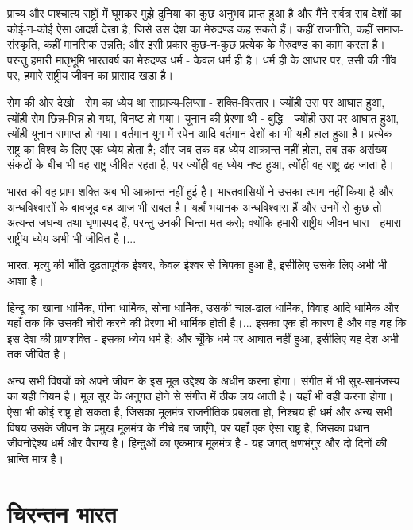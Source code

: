 प्राच्य और पाश्चात्य राष्ट्रों में घूमकर मुझे दुनिया का कुछ अनुभव प्राप्त हुआ है और मैंने सर्वत्र सब देशों का कोई-न-कोई ऐसा आदर्श देखा है, जिसे उस देश का मेरुदण्ड कह सकते हैं। कहीं राजनीति, कहीं समाज-संस्कृति, कहीं मानसिक उन्नति; और इसी प्रकार कुछ-न-कुछ प्रत्येक के मेरुदण्ड का काम करता है। परन्तु हमारी मातृभूमि भारतवर्ष का मेरुदण्ड धर्म - केवल धर्म ही है। धर्म ही के आधार पर, उसी की नींव पर, हमारे राष्ट्रीय जीवन का प्रासाद खड़ा है। 

रोम की ओर देखो। रोम का ध्येय था साम्राज्य-लिप्सा - शक्ति-विस्तार। ज्योंही उस पर आघात हुआ, त्योंही रोम छिन्न-भिन्न हो गया, विनष्ट हो गया। यूनान की प्रेरणा थी - बुद्धि। ज्योंही उस पर आघात हुआ, त्योंही यूनान समाप्त हो गया। वर्तमान युग में स्पेन आदि वर्तमान देशों का भी यही हाल हुआ है। प्रत्येक राष्ट्र का विश्व के लिए एक ध्येय होता है; और जब तक वह ध्येय आक्रान्त नहीं होता, तब तक असंख्य संकटों के बीच भी वह राष्ट्र जीवित रहता है, पर ज्योंही वह ध्येय नष्ट हुआ, त्योंही वह राष्ट्र ढह जाता है। 

भारत की वह प्राण-शक्ति अब भी आक्रान्त नहीं हुई है। भारतवासियों ने उसका त्याग नहीं किया है और अन्धविश्वासों के बावजूद वह आज भी सबल है। यहाँ भयानक अन्धविश्वास हैं और उनमें से कुछ तो अत्यन्त जघन्य तथा घृणास्पद हैं, परन्तु उनकी चिन्ता मत करो; क्योंकि हमारी राष्ट्रीय जीवन-धारा - हमारा राष्ट्रीय ध्येय अभी भी जीवित है।... 

भारत, मृत्यु की भाँति दृढ़तापूर्वक ईश्वर, केवल ईश्वर से चिपका हुआ है, इसीलिए उसके लिए अभी भी आशा है। 

हिन्दू का खाना धार्मिक, पीना धार्मिक, सोना धार्मिक, उसकी चाल-ढाल धार्मिक, विवाह आदि धार्मिक और यहाँ तक कि उसकी चोरी करने की प्रेरणा भी धार्मिक होती है।... इसका एक ही कारण है और वह यह कि इस देश की प्राणशक्ति - इसका ध्येय धर्म है; और चूँकि धर्म पर आघात नहीं हुआ, इसीलिए यह देश अभी तक जीवित है। 

अन्य सभी विषयों को अपने जीवन के इस मूल उद्देश्य के अधीन करना होगा। संगीत में भी सुर-सामंजस्य का यही नियम है। मूल सुर के अनुगत होने से संगीत में ठीक लय आती है। यहाँ भी वही करना होगा। ऐसा भी कोई राष्ट्र हो सकता है, जिसका मूलमंत्र राजनीतिक प्रबलता हो, निश्चय ही धर्म और अन्य सभी विषय उसके जीवन के प्रमुख मूलमंत्र के नीचे दब जाएँगे, पर यहाँ एक ऐसा राष्ट्र है, जिसका प्रधान जीवनोद्देश्य धर्म और वैराग्य है। हिन्दुओं का एकमात्र मूलमंत्र है - यह जगत् क्षणभंगुर और दो दिनों की भ्रान्ति मात्र है।


\section*{चिरन्तन भारत}

